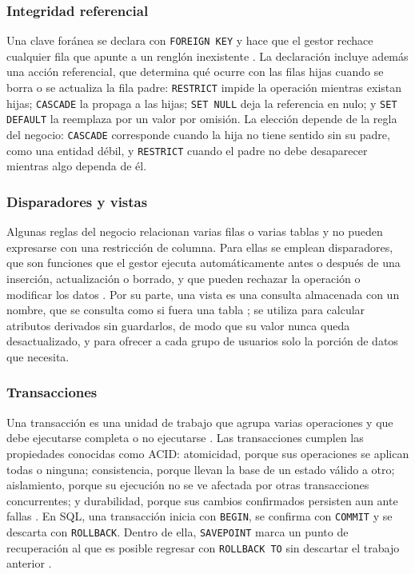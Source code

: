 \subsubsection{Integridad referencial}

Una clave foránea se declara con \texttt{FOREIGN KEY} y hace que el gestor rechace cualquier fila que apunte a un renglón inexistente \parencite{postgres_constraints}. La declaración incluye además una acción referencial, que determina qué ocurre con las filas hijas cuando se borra o se actualiza la fila padre: \texttt{RESTRICT} impide la operación mientras existan hijas; \texttt{CASCADE} la propaga a las hijas; \texttt{SET NULL} deja la referencia en nulo; y \texttt{SET DEFAULT} la reemplaza por un valor por omisión. La elección depende de la regla del negocio: \texttt{CASCADE} corresponde cuando la hija no tiene sentido sin su padre, como una entidad débil, y \texttt{RESTRICT} cuando el padre no debe desaparecer mientras algo dependa de él.

\subsubsection{Disparadores y vistas}

Algunas reglas del negocio relacionan varias filas o varias tablas y no pueden expresarse con una restricción de columna. Para ellas se emplean disparadores, que son funciones que el gestor ejecuta automáticamente antes o después de una inserción, actualización o borrado, y que pueden rechazar la operación o modificar los datos \parencite{postgres_triggers}. Por su parte, una vista es una consulta almacenada con un nombre, que se consulta como si fuera una tabla \parencite{postgres_createview}; se utiliza para calcular atributos derivados sin guardarlos, de modo que su valor nunca queda desactualizado, y para ofrecer a cada grupo de usuarios solo la porción de datos que necesita.

\subsubsection{Transacciones}

Una transacción es una unidad de trabajo que agrupa varias operaciones y que debe ejecutarse completa o no ejecutarse \parencite{postgres_transactions}. Las transacciones cumplen las propiedades conocidas como ACID: atomicidad, porque sus operaciones se aplican todas o ninguna; consistencia, porque llevan la base de un estado válido a otro; aislamiento, porque su ejecución no se ve afectada por otras transacciones concurrentes; y durabilidad, porque sus cambios confirmados persisten aun ante fallas \parencite{elmasri_navathe}. En SQL, una transacción inicia con \texttt{BEGIN}, se confirma con \texttt{COMMIT} y se descarta con \texttt{ROLLBACK}. Dentro de ella, \texttt{SAVEPOINT} marca un punto de recuperación al que es posible regresar con \texttt{ROLLBACK TO} sin descartar el trabajo anterior \parencite{postgres_savepoint}.

